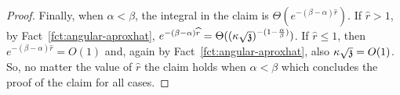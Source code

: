 \begin{proof}
Finally, when $\alpha<\beta$, the integral in the claim is
  $\Theta(e^{-(\beta-\alpha)\widehat{r}})$.
If $\widehat{r}>1$,  by Fact~\ref{fct:angular-aproxhat},
$e^{-(\beta-\alpha)\widehat{r}}
= \Theta((\kappa\sqrt{\ss})^{-(1-\frac{\alpha}{\beta})})$.
If $\widehat{r}\leq 1$, then $e^{-(\beta-\alpha)\widehat{r}}=O(1)$ and, again by Fact~\ref{fct:angular-aproxhat}, also $\kappa\sqrt{\ss}=O(1)$.
So, no matter the value of $\widehat{r}$ 
the claim holds when $\alpha<\beta$ which concludes the proof of the claim for all cases.
%
%

\end{proof}
